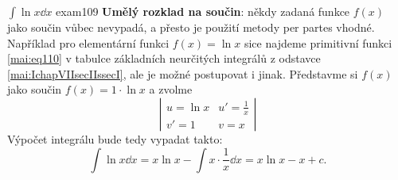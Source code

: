 \begin{mathexam}{\(\int\ln x\dd{x}\) \hfill\cite[s.~31]{Knichal}}{exam109} 
  \textbf{Umělý rozklad na součin}: někdy zadaná funkce \(f(x)\) jako součin vůbec nevypadá, a
  přesto je použití metody per partes vhodné. Například pro elementární funkci \(f(x) = \ln x\) sice
  najdeme primitivní funkci \ref{mai:eq110} v tabulce základních neurčitých integrálů z odstavce
  \ref{mai:IchapVIIsecIIssecI}, ale je možné postupovat i jinak. Představme si \(f(x)\) jako součin
  \(f(x) = 1\cdot\ln x\) a zvolme 
  \begin{equation*}
    \left\lvert
      \begin{array}{ll} 
        u  = \ln x  &  u'= \frac{1}{x}  \\
        v' = 1      &  v =  x   
      \end{array}
    \right\rvert
  \end{equation*}
  Výpočet integrálu bude tedy vypadat takto:
  \begin{equation*}
    \int\ln x\dd{x} = x\ln x - \int x\cdot\frac{1}{x}\dd{x}= x\ln x - x + c.
  \end{equation*}
\end{mathexam}